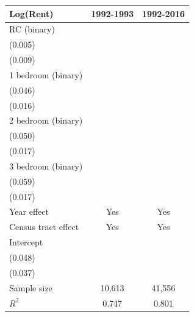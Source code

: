 \begin{table}[p]
\begin{center}
\begin{tabular}{lcc}
\toprule
Log(Rent) & 1992-1993 & 1992-2016 \\
\midrule
RC (binary) & \makecell{$-0.128^{\star\star\star}$\\(0.005)} & \makecell{$-0.098^{\star\star\star}$\\
(0.009)} \\
1 bedroom (binary) & \makecell{$0.189^{\star\star\star}$\\(0.046)} & \makecell{$0.147^{\star\star\star}$\\(0.016)} \\
2 bedroom (binary) & \makecell{$0.328^{\star\star\star}$\\(0.050)} & \makecell{$0.300^{\star\star\star}$\\(0.017)}\\
3 bedroom (binary) & \makecell{$0.516^{\star\star\star}$\\(0.059)} & \makecell{$0.455^{\star\star\star}$\\(0.017)}\\
Year effect & Yes & Yes \\
Census tract effect & Yes & Yes\\
Intercept & \makecell{$6.341^{\star\star\star}$\\(0.048)} & \makecell{$6.288^{\star\star\star}$\\(0.037)}\\
Sample size & 10,613 & 41,556\\
$R^{2}$ & 0.747 & 0.801 \\
\bottomrule
\end{tabular}
\end{center}
\normalsize
\end{table}